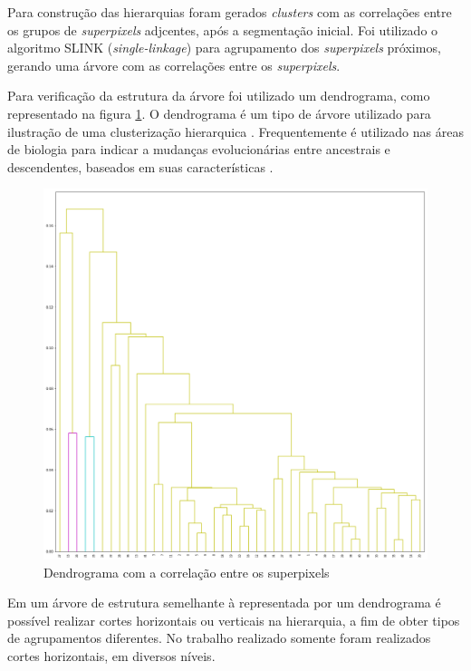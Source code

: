 \begin{document}
Para construção das hierarquias foram gerados \textit{clusters} com as correlações entre os grupos de \textit{superpixels} adjcentes, após a segmentação inicial. Foi utilizado o algoritmo SLINK (\textit{single-linkage}) para agrupamento dos \textit{superpixels} próximos, gerando uma árvore com as correlações entre os \textit{superpixels}.

Para verificação da estrutura da árvore foi utilizado um dendrograma, como representado na figura \ref{fig:DENDROGRAM}. O dendrograma é um tipo de árvore utilizado para ilustração de uma clusterização hierarquica \cite{WIKI_DENDROGRAM}. Frequentemente é utilizado nas áreas de biologia para indicar a mudanças evolucionárias entre ancestrais e descendentes, baseados em suas características \cite{DENDROGRAM}.

\begin{figure}[ht]
\centering
\includegraphics[width=1.\textwidth]{dendrogram.png}
\caption{Dendrograma com a correlação entre os superpixels}
\label{fig:DENDROGRAM}
\end{figure}

Em um árvore de estrutura semelhante à representada por um dendrograma é possível realizar cortes horizontais ou verticais na hierarquia, a fim de obter tipos de agrupamentos diferentes. No trabalho realizado somente foram realizados cortes horizontais, em diversos níveis. 
\end{document}
